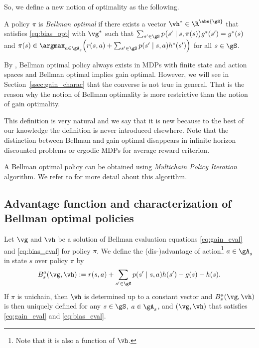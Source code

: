 So, we define a new notion of optimality as the following.
\begin{defn}
    \label{ch:mbp:defn:bellman}
    A policy $\pi$ is \emph{Bellman optimal} if there exists a vector $\vh^*\in\R^{\abs{\gS}}$ that satisfies \eqref{eq:bias_opt} with $\vg^*$ such that $\sum_{s'\in\gS}p\bigl(s'\mid s,\pi(s)\bigr)g^*(s')=g^*(s)$ and $\pi(s)\in\argmax_{a\in\gA_s}\Big(r(s,a) +\sum_{s'\in\gS}p(s'\mid s,a)h^*(s')\Big)$ for all $s\in\gS$.
\end{defn}
By \cite[Theorem~9.1.7]{puterman2014markov}, Bellman optimal policy always exists in MDPs with finite state and action spaces and Bellman optimal implies gain optimal.
However, we will see in Section~\ref{ssec:gain_charac} that the converse is not true in general.
That is the reason why the notion of Bellman optimality is more restrictive than the notion of gain optimality.

This definition is very natural and we say that it is new because to the best of our knowledge the definition is never introduced elsewhere.
Note that the distinction between Bellman and gain optimal disappears in infinite horizon discounted problems or ergodic MDPs for average reward criterion.

A Bellman optimal policy can be obtained using \emph{Multichain Policy Iteration} algorithm.
We refer to \cite[Section~9.2.1]{puterman2014markov} for more detail about this algorithm.

\subsection{Advantage function and characterization of Bellman optimal policies}

Let $\vg$ and $\vh$ be a solution of Bellman evaluation equations \eqref{eq:gain_eval} and \eqref{eq:bias_eval} for policy $\pi$.
We define the (dis-)advantage of action\footnote{Note that it is also a function of $\vh$.} $a\in\gA_s$ in state $s$ over policy $\pi$ by
\begin{equation}
    \label{eq:advan}
    B^a_s(\vg,\vh) := r(s,a) +\sum_{s'\in\gS}p(s'\mid s,a)h(s') -g(s) -h(s).
\end{equation}
If $\pi$ is unichain, then $\vh$ is determined up to a constant vector and $B^a_s(\vg,\vh)$ is then uniquely defined for any $s\in\gS$, $a\in\gA_s$, and $(\vg,\vh)$ that satisfies \eqref{eq:gain_eval} and \eqref{eq:bias_eval}.

